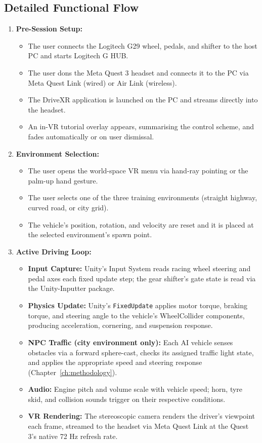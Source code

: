 \subsection{Detailed Functional Flow}
\begin{enumerate}
    \item \textbf{Pre-Session Setup:}
    \begin{itemize}
        \item The user connects the Logitech G29 wheel, pedals, and shifter to the host PC and starts Logitech G HUB.
        \item The user dons the Meta Quest 3 headset and connects it to the PC via Meta Quest Link (wired) or Air Link (wireless).
        \item The DriveXR application is launched on the PC and streams directly into the headset.
        \item An in-VR tutorial overlay appears, summarising the control scheme, and fades automatically or on user dismissal.
    \end{itemize}

    \item \textbf{Environment Selection:}
    \begin{itemize}
        \item The user opens the world-space VR menu via hand-ray pointing or the palm-up hand gesture.
        \item The user selects one of the three training environments (straight highway, curved road, or city grid).
        \item The vehicle's position, rotation, and velocity are reset and it is placed at the selected environment's spawn point.
    \end{itemize}

    \item \textbf{Active Driving Loop:}
    \begin{itemize}
        \item \textbf{Input Capture:} Unity's Input System reads racing wheel steering and pedal axes each fixed update step; the gear shifter's gate state is read via the Unity-Inputter package.
        \item \textbf{Physics Update:} Unity's \texttt{FixedUpdate} applies motor torque, braking torque, and steering angle to the vehicle's WheelCollider components, producing acceleration, cornering, and suspension response.
        \item \textbf{NPC Traffic (city environment only):} Each AI vehicle senses obstacles via a forward sphere-cast, checks its assigned traffic light state, and applies the appropriate speed and steering response (Chapter~\ref{ch:methodology}).
        \item \textbf{Audio:} Engine pitch and volume scale with vehicle speed; horn, tyre skid, and collision sounds trigger on their respective conditions.
        \item \textbf{VR Rendering:} The stereoscopic camera renders the driver's viewpoint each frame, streamed to the headset via Meta Quest Link at the Quest 3's native 72 Hz refresh rate.
    \end{itemize}


\end{enumerate}
